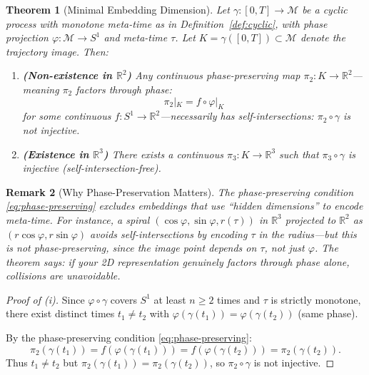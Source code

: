 \documentclass[12pt]{article}
\newtheorem{theorem}{Theorem}
\newtheorem{remark}[theorem]{Remark}
\newcommand{\R}{\mathbb{R}}
\newcommand{\M}{\mathcal{M}}
\begin{document}
\begin{theorem}[Minimal Embedding Dimension]\label{thm:main}
Let $\gamma: [0, T] \to \M$ be a cyclic process with monotone meta-time as in Definition~\ref{def:cyclic}, with phase projection $\varphi: \M \to S^1$ and meta-time $\tau$. Let $K = \gamma([0,T]) \subset \M$ denote the trajectory image. Then:
\begin{enumerate}
    \item[(i)] \textbf{(Non-existence in $\R^2$)} Any continuous \emph{phase-preserving} map $\pi_2: K \to \R^2$---meaning $\pi_2$ factors through phase:
    \begin{equation}\label{eq:phase-preserving}
        \pi_2|_K = f \circ \varphi|_K
    \end{equation}
    for some continuous $f: S^1 \to \R^2$---necessarily has self-intersections: $\pi_2 \circ \gamma$ is not injective.
    \item[(ii)] \textbf{(Existence in $\R^3$)} There exists a continuous $\pi_3: K \to \R^3$ such that $\pi_3 \circ \gamma$ is injective (self-intersection-free).
\end{enumerate}
\end{theorem}

\begin{remark}[Why Phase-Preservation Matters]
The phase-preserving condition \eqref{eq:phase-preserving} excludes embeddings that use ``hidden dimensions'' to encode meta-time. For instance, a spiral $(\cos\varphi, \sin\varphi, r(\tau))$ in $\R^3$ projected to $\R^2$ as $(r\cos\varphi, r\sin\varphi)$ avoids self-intersections by encoding $\tau$ in the radius---but this is \emph{not} phase-preserving, since the image point depends on $\tau$, not just $\varphi$. The theorem says: if your 2D representation genuinely factors through phase alone, collisions are unavoidable.
\end{remark}

\begin{proof}[Proof of (i)]
Since $\varphi \circ \gamma$ covers $S^1$ at least $n \geq 2$ times and $\tau$ is strictly monotone, there exist distinct times $t_1 \neq t_2$ with $\varphi(\gamma(t_1)) = \varphi(\gamma(t_2))$ (same phase).

By the phase-preserving condition \eqref{eq:phase-preserving}:
\[
\pi_2(\gamma(t_1)) = f(\varphi(\gamma(t_1))) = f(\varphi(\gamma(t_2))) = \pi_2(\gamma(t_2)).
\]
Thus $t_1 \neq t_2$ but $\pi_2(\gamma(t_1)) = \pi_2(\gamma(t_2))$, so $\pi_2 \circ \gamma$ is not injective.
\end{proof}
\end{document}
